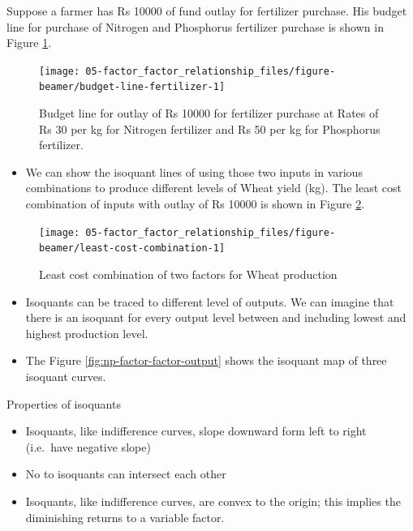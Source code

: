 \documentclass[12pt,ignorenonframetext,aspectratio=169]{beamer}
\providecommand{\tightlist}{%
  \setlength{\itemsep}{0pt}\setlength{\parskip}{0pt}}
\begin{document}
\begin{frame}{}
\protect\hypertarget{section-1}{}
Suppose a farmer has Rs 10000 of fund outlay for fertilizer purchase.
His budget line for purchase of Nitrogen and Phosphorus fertilizer
purchase is shown in Figure \ref{fig:budget-line-fertilizer}.

\begin{figure}
\texttt{[image: 05-factor\_factor\_relationship\_files/figure-beamer/budget-line-fertilizer-1]} \caption{Budget line for outlay of Rs 10000 for fertilizer purchase at Rates of Rs 30 per kg for Nitrogen fertilizer and Rs 50 per kg for Phosphorus fertilizer.}\label{fig:budget-line-fertilizer}
\end{figure}
\end{frame}

\begin{frame}{}
\protect\hypertarget{section-2}{}
\begin{itemize}
\tightlist
\item
  We can show the isoquant lines of using those two inputs in various
  combinations to produce different levels of Wheat yield (kg). The
  least cost combination of inputs with outlay of Rs 10000 is shown in
  Figure \ref{fig:least-cost-combination}.
\end{itemize}

\begin{figure}
\texttt{[image: 05-factor\_factor\_relationship\_files/figure-beamer/least-cost-combination-1]} \caption{Least cost combination of two factors for Wheat production}\label{fig:least-cost-combination}
\end{figure}
\end{frame}

\begin{frame}{}
\protect\hypertarget{section-3}{}
\begin{itemize}
\tightlist
\item
  Isoquants can be traced to different level of outputs. We can imagine
  that there is an isoquant for every output level between and including
  lowest and highest production level.
\item
  The Figure \ref{fig:np-factor-factor-output} shows the isoquant map of
  three isoquant curves.
\end{itemize}
\end{frame}

\begin{frame}{Properties of isoquants}
\protect\hypertarget{properties-of-isoquants}{}
\begin{itemize}
\tightlist
\item
  Isoquants, like indifference curves, slope downward form left to right
  (i.e.~have negative slope)
\item
  No to isoquants can intersect each other
\item
  Isoquants, like indifference curves, are convex to the origin; this
  implies the diminishing returns to a variable factor.
\end{itemize}
\end{frame}
\end{document}
